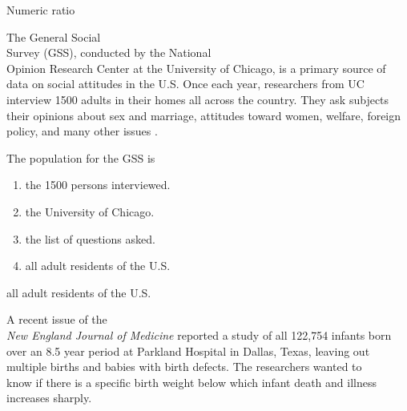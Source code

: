 \documentclass[11pt]{book}\usepackage[]{graphicx}\usepackage[]{color}
\begin{document}
\begin{exercises}
\begin{exercise}
    \vspace{4mm}


  \end{exercise}
  \vspace{2mm}
  \begin{solution}   %

    Numeric  ratio

  \end{solution}

	\begin{exercise}  %

	  The General Social \\ Survey (GSS), conducted by the National \\ Opinion Research Center at the University of Chicago, is a primary source of data on social attitudes in the U.S.  Once each year, researchers from UC interview 1500 adults in their homes all across the country.  They ask subjects their opinions about sex and marriage, attitudes toward women, welfare, foreign policy, and many other issues \cite{GSS2014}.

    The population for the GSS is
    \begin{enumerate}
    \item the 1500 persons interviewed.
    \item the University of Chicago.
    \item the list of questions asked.
    \item all adult residents of the U.S.
    \end{enumerate}
    \vspace{3mm}

  \end{exercise}
  \vspace{2mm}
  \begin{solution}   %

    all adult residents of the U.S.
  \end{solution}

\begin{exercise}  %

	  A recent issue of the \\ \emph{New England Journal of Medicine} reported a study of all 122,754 infants born over an 8.5 year period at Parkland Hospital in Dallas, Texas, leaving out multiple births and babies with birth defects.  The researchers  wanted to \\ know if there is a specific birth weight below which infant death and illness increases sharply.


\end{exercise}
\end{exercises}
\end{document}
